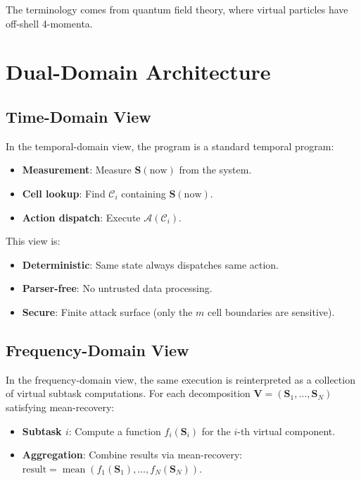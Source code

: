 \documentclass[twocolumn,11pt,a4paper]{article}
\newcommand{\Stuple}{\mathbf{S}}
\newcommand{\calC}{\mathcal{C}}
\DeclareMathOperator{\mean}{mean}
\begin{document}
The terminology comes from quantum field theory, where virtual particles have off-shell 4-momenta.

\section{Dual-Domain Architecture}
\label{sec:dualdom}

\subsection{Time-Domain View}

In the temporal-domain view, the program is a standard temporal program:
\begin{itemize}[nosep,leftmargin=1em]
  \item \textbf{Measurement}: Measure $\Stuple(\text{now})$ from the system.
  \item \textbf{Cell lookup}: Find $\calC_i$ containing $\Stuple(\text{now})$.
  \item \textbf{Action dispatch}: Execute $\mathcal{A}(\calC_i)$.
\end{itemize}

This view is:
\begin{itemize}[nosep,leftmargin=1em]
  \item \textbf{Deterministic}: Same state always dispatches same action.
  \item \textbf{Parser-free}: No untrusted data processing.
  \item \textbf{Secure}: Finite attack surface (only the $m$ cell boundaries are sensitive).
\end{itemize}

\subsection{Frequency-Domain View}

In the frequency-domain view, the same execution is reinterpreted as a collection of virtual subtask computations. For each decomposition $\mathbf{V} = (\Stuple_1, \ldots, \Stuple_N)$ satisfying mean-recovery:

\begin{itemize}[nosep,leftmargin=1em]
  \item \textbf{Subtask $i$}: Compute a function $f_i(\Stuple_i)$ for the $i$-th virtual component.
  \item \textbf{Aggregation}: Combine results via mean-recovery: $\text{result} = \mean(f_1(\Stuple_1), \ldots, f_N(\Stuple_N))$.
\end{itemize}
\end{document}
